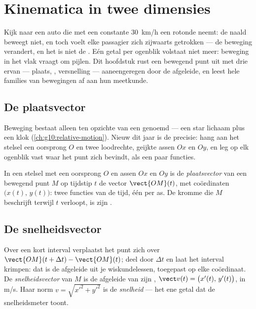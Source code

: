\chapter{Kinematica in twee dimensies}\label{ch:g12:kinematics-2d}

Kijk naar een auto die met een constante \qty{30}{km/h} een rotonde
neemt: de naald beweegt niet, en toch voelt elke passagier zich zijwaarts
getrokken --- de beweging verandert, en het is niet de . Eén getal
per ogenblik volstaat niet meer: beweging in het vlak vraagt om pijlen.
Dit hoofdstuk rust een bewegend punt uit met drie ervan --- plaats,
, versnelling --- aaneengeregen door de afgeleide, en leest hele
families van bewegingen af aan hun meetkunde.

\section{De plaatsvector}

Beweging bestaat alleen ten opzichte van een genoemd  ---
een star lichaam plus een klok (\cref{ch:g10:relative-motion}). Nieuw dit
jaar is de precisie: hang aan het stelsel een oorsprong $O$ en twee
loodrechte, geijkte assen $Ox$ en $Oy$, en leg op elk ogenblik vast waar
het punt zich bevindt, als een paar functies.

\begin{definition}[Plaatsvector]\label{def:g12:kinematics-2d:position}
In een stelsel met een oorsprong $O$ en assen $Ox$ en $Oy$ is de
\emph{plaatsvector} van een bewegend punt $M$ op
tijdstip $t$ de vector $\vect{OM}(t)$, met coördinaten
$\bigl(x(t),\, y(t)\bigr)$: twee functies van de tijd, één per as. De
kromme die $M$ beschrijft terwijl $t$ verloopt, is zijn .
\end{definition}

\section{De snelheidsvector}

\begin{definition}[Snelheidsvector]\label{def:g12:kinematics-2d:velocity}
Over een kort interval verplaatst het punt zich over
$\vect{OM}(t+\Delta t) - \vect{OM}(t)$; deel door $\Delta t$ en laat het
interval krimpen: dat is de afgeleide uit je wiskundelessen, toegepast op
elke coördinaat. De \emph{snelheidsvector} van $M$
is de afgeleide van zijn ,
$\vect v(t) = \bigl(x'(t),\, y'(t)\bigr)$, in \unit{m/s}. Haar norm
$v = \sqrt{x'^2 + y'^2}$ is de \emph{snelheid} --- het
ene getal dat de snelheidsmeter toont.
\end{definition}

